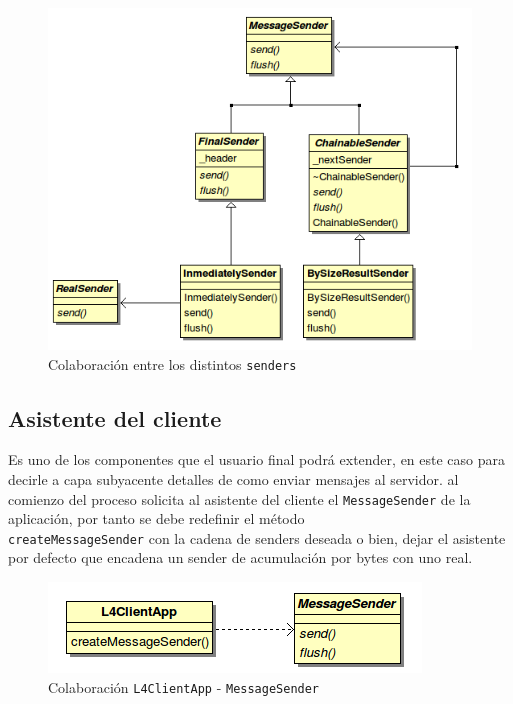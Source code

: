             \begin{figure}[!htb] \hspace{0cm}
            \includegraphics[scale=0.70]{images/senders.png}
            \caption{Colaboración entre los distintos \texttt{senders}}
            \label{MessageSenders}
        \end{figure}


\subsection{Asistente del cliente}

Es uno de los componentes que el usuario final podrá extender, en este caso para decirle a capa subyacente detalles de
como enviar mensajes al servidor. \rc{} al comienzo del proceso solicita al asistente del cliente el
\texttt{MessageSender} de la aplicación, por tanto se debe redefinir el método \\ \texttt{createMessageSender} con la
cadena de senders deseada o bien, dejar el asistente por defecto que encadena un sender de acumulación por bytes con
uno real.

        \begin{figure}[!htb] \hspace{2cm}
            \includegraphics[scale=0.70]{images/l4_client_app.png}
            \caption{Colaboración \texttt{L4ClientApp} - \texttt{MessageSender}}
            \label{l4ca_sender}
        \end{figure}

